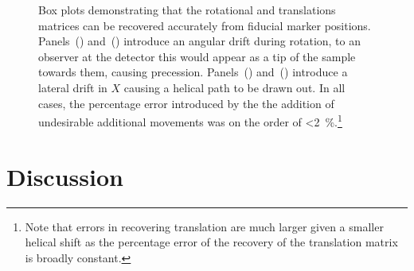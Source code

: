 \documentclass{osa-article}
\begin{document}
\begin{figure}
  \caption[Box plots demonstrating that the rotational and translations matrices can be recovered accurately from fiducial marker positions]{Box plots demonstrating that the rotational and translations matrices can be recovered accurately from fiducial marker positions.
    Panels~() and~() introduce an angular drift during rotation, to an observer at the detector this would appear as a tip of the sample towards them, causing precession.
    Panels~() and~() introduce a lateral drift in \(X\) causing a helical path to be drawn out.
    In all cases, the percentage error introduced by the the addition of undesirable additional movements was on the order of \SI{<2}{\percent}.\footnote{Note that errors in recovering translation are much larger given a smaller helical shift as the percentage error of the recovery of the translation matrix is broadly constant.}
  }\label{fig:pc_sum_decompose}
\end{figure}

\section*{Discussion}
\end{document}
